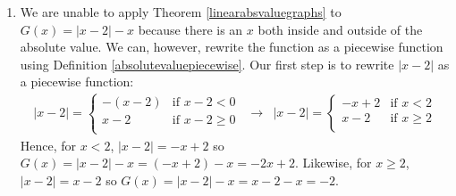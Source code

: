 \documentclass{ximera}
\begin{document}
\begin{example}
\begin{enumerate}
\begin{enumerate}
\begin{image}
\end{image}

The range is $(-\infty, 2]$  with a maximum of $2$ at $t = \frac{5}{3}$ and $f$ is increasing on $\left(-\infty, \frac{5}{3} \right]$ then decreasing on $\left[ \frac{5}{3}, \infty \right)$.


\item  We are unable to apply Theorem \ref{linearabsvaluegraphs} to $G(x) = |x-2| - x$ because there is an $x$ both inside and outside of the absolute value. We can, however, rewrite the function as a piecewise function using Definition \ref{absolutevaluepiecewise}. Our first step is to rewrite $|x-2|$ as a piecewise function: \[ \begin{array}{ccc}

 |x-2|  = \begin{cases} 
      -(x - 2) &  \text{if $x - 2  < 0$} \\
     x - 2  & \text{if $x - 2 \geq 0$} \\
   \end{cases}
   
 &
 
 \longrightarrow
 
 &
 
 |x - 2|  = \begin{cases} 
     -x + 2 &  \text{if $x < 2$} \\
     x - 2  & \text{if $x \geq 2$} \\
   \end{cases}
   
   \end{array}  \] Hence, for $x < 2$, $|x - 2| = -x + 2$ so $G(x) = |x - 2| - x = (-x + 2) - x = -2x + 2$.  Likewise, for $x \geq 2$, $|x - 2| = x - 2$ so $G(x) = |x - 2| - x = x - 2 - x = -2$. \[ \begin{array}{ccc}


\end{array}\]
\end{enumerate}
\end{enumerate}
\end{example}
\end{document}
